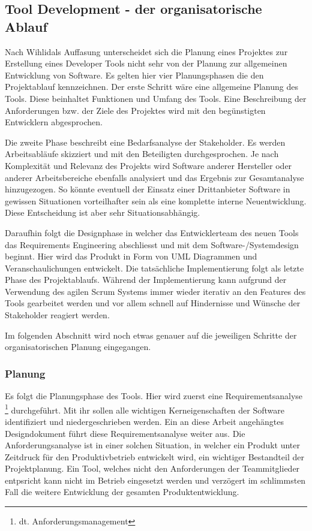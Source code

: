 \documentclass[pagesize, paper=a4, fontsize=12pt,titlepage=true, headings=small, headnosepline, abstractoff, liststotoc, nochapterprefix, plainheadsepline, twoside]{scrreprt}
\begin{document}
\subsection{Tool Development - der organisatorische Ablauf}
Nach Wihlidals Auffasung \parencite{Wihlidal2006} unterscheidet sich die Planung eines Projektes zur Erstellung eines Developer Tools nicht sehr von der Planung zur allgemeinen Entwicklung von Software. Es gelten hier vier Planungsphasen die den Projektablauf kennzeichnen. Der erste Schritt wäre eine allgemeine Planung des Tools. Diese beinhaltet Funktionen und Umfang des Tools. Eine Beschreibung der Anforderungen bzw. der Ziele des Projektes wird mit den begünstigten Entwicklern abgesprochen.

Die zweite Phase beschreibt eine Bedarfsanalyse der Stakeholder. Es werden Arbeitsabläufe skizziert und mit den Beteiligten durchgesprochen. Je nach Komplexität und Relevanz des Projekts wird Software anderer Hersteller oder anderer Arbeitsbereiche ebenfalls analysiert und das Ergebnis zur Gesamtanalyse hinzugezogen. So könnte eventuell der Einsatz einer Drittanbieter Software in gewissen Situationen vorteilhafter sein als eine komplette interne Neuentwicklung. Diese Entscheidung ist aber sehr Situationsabhängig.

Daraufhin folgt die Designphase in welcher das Entwicklerteam des neuen Tools das Requirements Engineering abschliesst und mit dem Software-/Systemdesign beginnt. Hier wird das Produkt in Form von UML Diagrammen und Veranschaulichungen entwickelt. Die tatsächliche Implementierung folgt als letzte Phase des Projektablaufs. Während der Implementierung kann aufgrund der Verwendung des agilen Scrum Systems immer wieder iterativ an den Features des Tools gearbeitet werden und vor allem schnell auf Hindernisse und Wünsche der Stakeholder reagiert werden.

Im folgenden Abschnitt wird noch etwas genauer auf die jeweiligen Schritte der organisatorischen Planung eingegangen.

\subsubsection{Planung}
Es folgt die Planungsphase des Tools. Hier wird zuerst eine Requirementsanalyse \footnote{dt. Anforderungsmanagement} durchgeführt. Mit ihr sollen alle wichtigen Kerneigenschaften der Software identifiziert und niedergeschrieben werden. Ein an diese Arbeit angehängtes Designdokument führt diese Requirementsanalyse weiter aus. Die Anforderungsanalyse ist in einer solchen Situation, in welcher ein Produkt unter Zeitdruck für den Produktivbetrieb entwickelt wird, ein wichtiger Bestandteil der Projektplanung. Ein Tool, welches nicht den Anforderungen der Teammitglieder entpsricht kann nicht im Betrieb eingesetzt werden und verzögert im schlimmsten Fall die weitere Entwicklung der gesamten Produktentwicklung.
\end{document}
